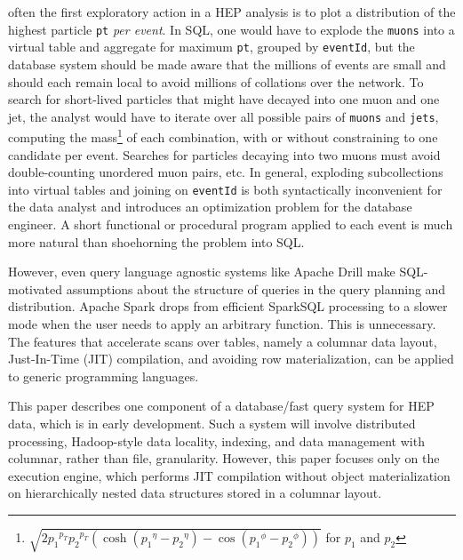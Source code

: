 \documentclass[10pt, conference, compsocconf]{IEEEtran}
\begin{document}
\vspace{0.15 cm}
\noindent often the first exploratory action in a HEP analysis is to plot a distribution of the highest particle {\tt pt} {\it per event}. In SQL, one would have to explode the {\tt muons} into a virtual table and aggregate for maximum {\tt pt}, grouped by {\tt eventId}, but the database system should be made aware that the millions of events are small and should each remain local to avoid millions of collations over the network. To search for short-lived particles that might have decayed into one muon and one jet, the analyst would have to iterate over all possible pairs of {\tt muons} and {\tt jets}, computing the mass\footnote{$\sqrt{2 {p_1}^{p_T} {p_2}^{p_T} (\cosh({p_1}^\eta - {p_2}^\eta) - \cos({p_1}^\phi - {p_2}^\phi))}$ for $p_1$ and $p_2$} of each combination, with or without constraining to one candidate per event. Searches for particles decaying into two muons must avoid double-counting unordered muon pairs, etc. In general, exploding subcollections into virtual tables and joining on {\tt eventId} is both syntactically inconvenient for the data analyst and introduces an optimization problem for the database engineer. A short functional or procedural program applied to each event is much more natural than shoehorning the problem into SQL.

However, even query language agnostic systems like Apache Drill\cite{drill} make SQL-motivated assumptions about the structure of queries in the query planning and distribution. Apache Spark\cite{spark} drops from efficient SparkSQL\cite{sparksql} processing to a slower mode when the user needs to apply an arbitrary function. This is unnecessary. The features that accelerate scans over tables, namely a columnar data layout, Just-In-Time (JIT) compilation, and avoiding row materialization, can be applied to generic programming languages.

This paper describes one component of a database/fast query system for HEP data, which is in early development. Such a system will involve distributed processing, Hadoop-style data locality, indexing, and data management with columnar, rather than file, granularity. However, this paper focuses only on the execution engine, which performs JIT compilation without object materialization on hierarchically nested data structures stored in a columnar layout.
\end{document}
